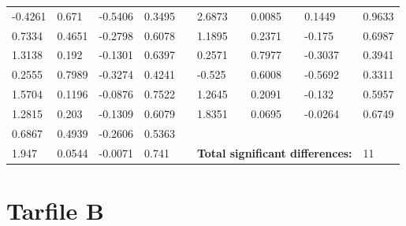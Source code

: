 \begin{table}[h!]
\begin{tabular}{lllllllll}
-0.4261 & 0.671 & -0.5406 & 0.3495 &  & 2.6873 & 0.0085 & 0.1449 & 0.9633 \\
0.7334 & 0.4651 & -0.2798 & 0.6078 &  & 1.1895 & 0.2371 & -0.175 & 0.6987 \\
1.3138 & 0.192 & -0.1301 & 0.6397 &  & 0.2571 & 0.7977 & -0.3037 & 0.3941 \\
0.2555 & 0.7989 & -0.3274 & 0.4241 &  & -0.525 & 0.6008 & -0.5692 & 0.3311 \\
1.5704 & 0.1196 & -0.0876 & 0.7522 &  & 1.2645 & 0.2091 & -0.132 & 0.5957 \\
1.2815 & 0.203 & -0.1309 & 0.6079 &  & 1.8351 & 0.0695 & -0.0264 & 0.6749 \\\cline{6-9} 
0.6867 & 0.4939 & -0.2606 & 0.5363 &  &  &  &  &  \\
1.947 & 0.0544 & -0.0071 & 0.741 &  &\multicolumn{3}{l}{\textbf{Total significant differences:}} & 11
\end{tabular}
\end{table}




\chapter{Tarfile B}

